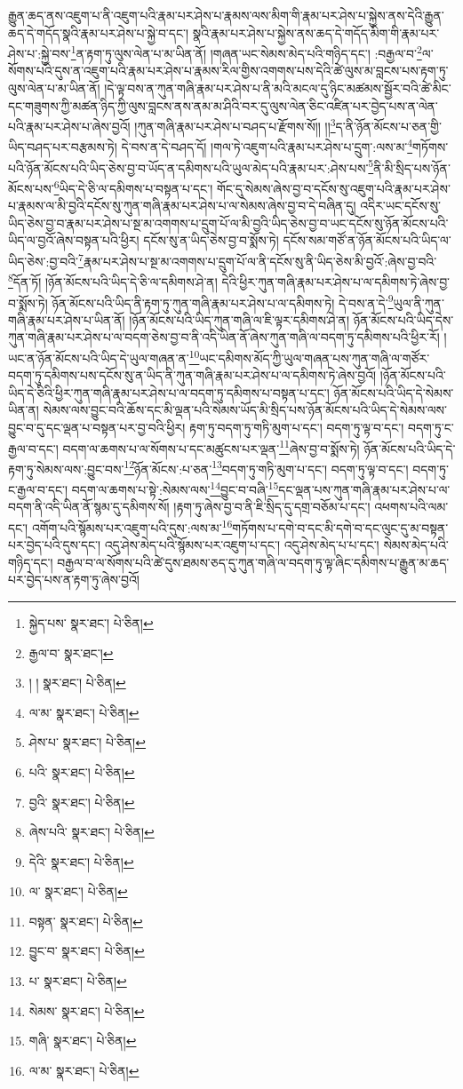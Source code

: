 རྒྱུན་ཆད་ནས་འཇུག་པ་ནི་འཇུག་པའི་རྣམ་པར་ཤེས་པ་རྣམས་ལས་མིག་གི་རྣམ་པར་ཤེས་པ་སྐྱེས་ནས་དེའི་རྒྱུན་ཆད་དེ་གདོད་སྣའི་རྣམ་པར་ཤེས་པ་སྐྱེ་བ་དང་། སྣའི་རྣམ་པར་ཤེས་པ་སྐྱེས་ནས་ཆད་དེ་གདོད་མིག་གི་རྣམ་པར་ཤེས་པ་:སྐྱེ་བས་\footnote{སྐྱེད་པས་  སྣར་ཐང་།  པེ་ཅིན། }ན་རྟག་ཏུ་ལུས་ལེན་པ་མ་ཡིན་ནོ། །གཞན་ཡང་སེམས་མེད་པའི་གཉིད་དང་། :བརྒྱལ་བ་\footnote{རྒྱལ་བ་  སྣར་ཐང་། }ལ་སོགས་པའི་དུས་ན་འཇུག་པའི་རྣམ་པར་ཤེས་པ་རྣམས་རིལ་གྱིས་འགགས་པས་དེའི་ཚེ་ལུས་མ་བླངས་པས་རྟག་ཏུ་ལུས་ལེན་པ་མ་ཡིན་ནོ། །དེ་ལྟ་བས་ན་ཀུན་གཞི་རྣམ་པར་ཤེས་པ་ནི་མའི་མངལ་དུ་ཉིང་མཚམས་སྦྱོར་བའི་ཚེ་མིང་དང་གཟུགས་ཀྱི་མཚན་ཉིད་ཀྱི་ལུས་བླངས་ནས་ནམ་མ་ཤིའི་བར་དུ་ལུས་ལེན་ཅིང་འཛིན་པར་བྱེད་པས་ན་ལེན་པའི་རྣམ་པར་ཤེས་པ་ཞེས་བྱའོ། །ཀུན་གཞི་རྣམ་པར་ཤེས་པ་བཤད་པ་རྫོགས་སོ།། །།\footnote{། །  སྣར་ཐང་།  པེ་ཅིན། }ད་ནི་ཉོན་མོངས་པ་ཅན་གྱི་ཡིད་བཤད་པར་བརྩམས་ཏེ། དེ་བས་ན་དེ་བཤད་དོ། །གལ་ཏེ་འཇུག་པའི་རྣམ་པར་ཤེས་པ་དྲུག་:ལས་མ་\footnote{ལ་མ་  སྣར་ཐང་།  པེ་ཅིན། }གཏོགས་པའི་ཉོན་མོངས་པའི་ཡིད་ཅེས་བྱ་བ་ཡོད་ན་དམིགས་པའི་ཡུལ་མེད་པའི་རྣམ་པར་:ཤེས་པས་\footnote{ཤེས་པ་  སྣར་ཐང་།  པེ་ཅིན། }ནི་མི་སྲིད་པས་ཉོན་མོངས་པས་\footnote{པའི་  སྣར་ཐང་།  པེ་ཅིན། }ཡིད་དེ་ཅི་ལ་དམིགས་པ་བསྟན་པ་དང་། གོང་དུ་སེམས་ཞེས་བྱ་བ་དངོས་སུ་འཇུག་པའི་རྣམ་པར་ཤེས་པ་རྣམས་ལ་མི་བྱའི་དངོས་སུ་ཀུན་གཞི་རྣམ་པར་ཤེས་པ་ལ་སེམས་ཞེས་བྱ་བ་དེ་བཞིན་དུ། འདིར་ཡང་དངོས་སུ་ཡིད་ཅེས་བྱ་བ་རྣམ་པར་ཤེས་པ་སྔ་མ་འགགས་པ་དྲུག་པོ་ལ་མི་བྱའི་ཡིད་ཅེས་བྱ་བ་ཡང་དངོས་སུ་ཉོན་མོངས་པའི་ཡིད་ལ་བྱའོ་ཞེས་བསྟན་པའི་ཕྱིར། དངོས་སུ་ན་ཡིད་ཅེས་བྱ་བ་སྨོས་ཏེ། དངོས་སམ་གཙོ་ན་ཉོན་མོངས་པའི་ཡིད་ལ་ཡིད་ཅེས་:བྱ་བའི་\footnote{བྱའི་  སྣར་ཐང་།  པེ་ཅིན། }རྣམ་པར་ཤེས་པ་སྔ་མ་འགགས་པ་དྲུག་པོ་ལ་ནི་དངོས་སུ་ནི་ཡིད་ཅེས་མི་བྱའོ་:ཞེས་བྱ་བའི་\footnote{ཞེས་པའི་  སྣར་ཐང་།  པེ་ཅིན། }དོན་ཏོ། །ཉོན་མོངས་པའི་ཡིད་དེ་ཅི་ལ་དམིགས་ཤེ་ན། དེའི་ཕྱིར་ཀུན་གཞི་རྣམ་པར་ཤེས་པ་ལ་དམིགས་ཏེ་ཞེས་བྱ་བ་སྨོས་ཏེ། ཉོན་མོངས་པའི་ཡིད་ནི་རྟག་ཏུ་ཀུན་གཞི་རྣམ་པར་ཤེས་པ་ལ་དམིགས་ཏེ། དེ་བས་ན་དེ་\footnote{དེའི་  སྣར་ཐང་།  པེ་ཅིན། }ཡུལ་ནི་ཀུན་གཞི་རྣམ་པར་ཤེས་པ་ཡིན་ནོ། །ཉོན་མོངས་པའི་ཡིད་ཀུན་གཞི་ལ་ཇི་ལྟར་དམིགས་ཤེ་ན། ཉོན་མོངས་པའི་ཡིད་དེས་ཀུན་གཞི་རྣམ་པར་ཤེས་པ་ལ་བདག་ཅེས་བྱ་བ་ནི་འདི་ཡིན་ནོ་ཞེས་ཀུན་གཞི་ལ་བདག་ཏུ་དམིགས་པའི་ཕྱིར་རོ། །ཡང་ན་ཉོན་མོངས་པའི་ཡིད་དེ་ཡུལ་གཞན་ན་\footnote{ལ་  སྣར་ཐང་།  པེ་ཅིན། }ཡང་དམིགས་མོད་ཀྱི་ཡུལ་གཞན་པས་ཀུན་གཞི་ལ་གཙོར་བདག་ཏུ་དམིགས་པས་དངོས་སུ་ན་ཡིད་ནི་ཀུན་གཞི་རྣམ་པར་ཤེས་པ་ལ་དམིགས་ཏེ་ཞེས་བྱའོ། །ཉོན་མོངས་པའི་ཡིད་དེ་ཅིའི་ཕྱིར་ཀུན་གཞི་རྣམ་པར་ཤེས་པ་ལ་བདག་ཏུ་དམིགས་པ་བསྟན་པ་དང་། ཉོན་མོངས་པའི་ཡིད་དེ་སེམས་ཡིན་ན། སེམས་ལས་བྱུང་བའི་ཆོས་དང་མི་ལྡན་པའི་སེམས་ཡོད་མི་སྲིད་པས་ཉོན་མོངས་པའི་ཡིད་དེ་སེམས་ལས་བྱུང་བ་དུ་དང་ལྡན་པ་བསྟན་པར་བྱ་བའི་ཕྱིར། རྟག་ཏུ་བདག་ཏུ་གཏི་མུག་པ་དང་། བདག་ཏུ་ལྟ་བ་དང་། བདག་ཏུ་ང་རྒྱལ་བ་དང་། བདག་ལ་ཆགས་པ་ལ་སོགས་པ་དང་མཚུངས་པར་ལྡན་\footnote{བསྟན་  སྣར་ཐང་།  པེ་ཅིན། }ཞེས་བྱ་བ་སྨོས་ཏེ། ཉོན་མོངས་པའི་ཡིད་དེ་རྟག་ཏུ་སེམས་ལས་:བྱུང་བས་\footnote{བྱུང་བ་  སྣར་ཐང་།  པེ་ཅིན། }ཉོན་མོངས་:པ་ཅན་\footnote{པ་  སྣར་ཐང་།  པེ་ཅིན། }བདག་ཏུ་གཏི་མུག་པ་དང་། བདག་ཏུ་ལྟ་བ་དང་། བདག་ཏུ་ང་རྒྱལ་བ་དང་། བདག་ལ་ཆགས་པ་སྟེ་:སེམས་ལས་\footnote{སེམས་  སྣར་ཐང་།  པེ་ཅིན། }བྱུང་བ་བཞི་\footnote{གཞི་  སྣར་ཐང་།  པེ་ཅིན། }དང་ལྡན་པས་ཀུན་གཞི་རྣམ་པར་ཤེས་པ་ལ་བདག་ནི་འདི་ཡིན་ནོ་སྙམ་དུ་དམིགས་སོ། །རྟག་ཏུ་ཞེས་བྱ་བ་ནི་ཇི་སྲིད་དུ་དགྲ་བཅོམ་པ་དང་། འཕགས་པའི་ལམ་དང་། འགོག་པའི་སྙོམས་པར་འཇུག་པའི་དུས་:ལས་མ་\footnote{ལ་མ་  སྣར་ཐང་།  པེ་ཅིན། }གཏོགས་པ་དགེ་བ་དང་མི་དགེ་བ་དང་ལུང་དུ་མ་བསྟན་པར་བྱེད་པའི་དུས་དང་། འདུ་ཤེས་མེད་པའི་སྙོམས་པར་འཇུག་པ་དང་། འདུ་ཤེས་མེད་པ་པ་དང་། སེམས་མེད་པའི་གཉིད་དང་། བརྒྱལ་བ་ལ་སོགས་པའི་ཚེ་དུས་ཐམས་ཅད་དུ་ཀུན་གཞི་ལ་བདག་ཏུ་ལྟ་ཞིང་དམིགས་པ་རྒྱུན་མ་ཆད་པར་བྱེད་པས་ན་རྟག་ཏུ་ཞེས་བྱའོ། 